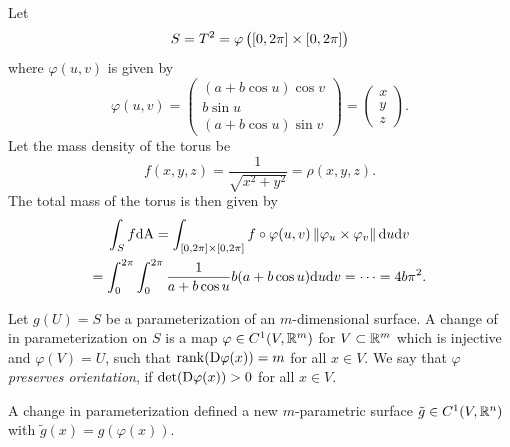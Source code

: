 \documentclass[11pt,a4paper]{article}
\begin{document}
\begin{example}
  Let
  \[
    S = T^2 =
    \varphi\del{[0,2\pi] \times [0,2\pi]}
  \]
  where $\varphi(u,v)$ is given by
  \[
    \varphi(u,v) =
    \begin{pmatrix}
      (a + b \cos u) \cos v \\
      b \sin u \\
      (a + b \cos u) \sin v
    \end{pmatrix} =
    \begin{pmatrix}
      x \\ y \\ z
    \end{pmatrix}.
  \]
  Let the mass density of the torus be
  \[
    f(x,y,z) =
    \frac{1}{\sqrt{x^2 + y^2}} = \rho(x,y,z).
  \]
  The total mass of the torus is then given by
  \begin{multline*}
    \int_{S} f \mathrm{d} \mathrm{A} =
    \int_{[0,2\pi] \times [0,2\pi]}
      f \circ \varphi(u,v) \left\lVert\varphi_u \times \varphi_v\right\rVert \mathrm{d} u \mathrm{d} v \\ =
    \int_{0}^{2\pi} \int_{0}^{2\pi}
      \frac{1}{a + b \cos u} b (a + b \cos u) \mathrm{d} u \mathrm{d} v = \cdots = 4b \pi^2.
    \end{multline*}
\end{example}

\begin{definition}
  Let $g(U) = S$ be a parameterization of an $m$-dimensional surface.
  A change of in parameterization on $S$ is a map $\varphi \in C^1(V,\mathbb{R}^m)$
  for $V \subset \mathbb{R}^m$ which is injective and $\varphi(V) = U$,
  such that $\operatorname{rank}(\mathrm{D} \varphi(x)) = m$ for all $x \in V$.
  We say that $\varphi$ \textit{preserves orientation},
  if $\det(\mathrm{D} \varphi(x)) > 0$ for all $x \in V$.
\end{definition}

\begin{remark}
  A change in parameterization defined a new $m$-parametric surface
  $\tilde g \in C^1(V,\mathbb{R}^n)$ with $\tilde g(x) = g(\varphi(x))$.
\end{remark}
\end{document}
